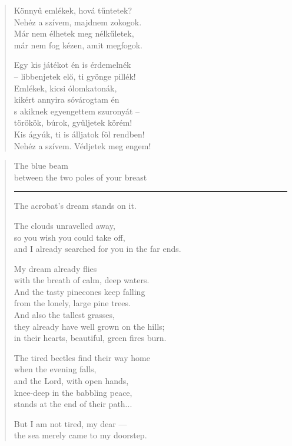 \documentclass[11pt]{book}
\newcommand*{\centeredornament}{\centerline{\pgfornament[width=6cm]{88}}}
\begin{document}
\vspace*{-15mm}
\centeredornament



\begin{verse}
  Könnyű emlékek, hová tűntetek? \\
  Nehéz a szívem, majdnem zokogok. \\
  Már nem élhetek meg nélkűletek, \\
  már nem fog kézen, amit megfogok.

  Egy kis játékot én is érdemelnék \\
  -- libbenjetek elő, ti gyönge pillék! \\
  Emlékek, kicsi ólomkatonák, \\
  kikért annyira sóvárogtam én \\
  s akiknek egyengettem szuronyát -- \\
  törökök, búrok, gyűljetek körém! \\
  Kis ágyúk, ti is álljatok föl rendben! \\
  Nehéz a szívem. Védjetek meg engem!
\end{verse}

\newpage

\vspace*{-15mm}
\centeredornament



\begin{verse}
  The blue beam \\
  between the two poles of your breast \\
  \rule[0.2em]{4em}{0.5pt} The acrobat's dream stands on it.

  The clouds unravelled away, \\
  so you wish you could take off, \\
  and I already searched for you in the far ends.\hspace*{-1mm}

  My dream already flies \\
  with the breath of calm, deep waters. \\
  And the tasty pinecones keep falling \\
  from the lonely, large pine trees. \\
  And also the tallest grasses, \\
  they already have well grown on the hills; \\
  in their hearts, beautiful, green fires burn.

  The tired beetles find their way home \\
  when the evening falls, \\
  and the Lord, with open hands, \\
  knee-deep in the babbling peace, \\
  stands at the end of their path...

  But I am not tired, my dear --- \\
  the sea merely came to my doorstep.
\end{verse}
\end{document}

